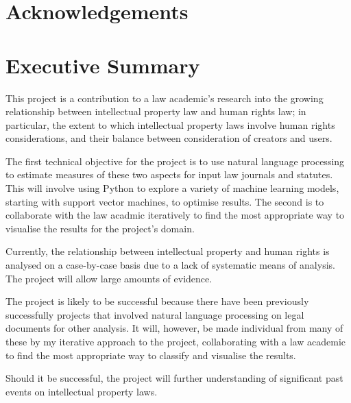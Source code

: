 \section*{Acknowledgements}
	\newpage
	
\section*{Executive Summary}	
	This project is a contribution to a law academic's research into the growing relationship between intellectual 	property law and human rights law; in particular, the extent to which intellectual property laws involve human rights considerations, and their balance between consideration of creators and users. 
	
	The first technical objective for the project is to use natural language processing to estimate measures of these two aspects for input law journals and statutes. This will involve using Python to explore a variety of machine learning models, starting with support vector machines, to optimise results. The second is to collaborate with the law acadmic iteratively to find the most appropriate way to visualise the results for the project's domain.

Currently, the relationship between intellectual property and human rights is analysed on a case-by-case basis due to a lack of systematic means of analysis. The project will allow large amounts of evidence.  

The project is likely to be successful because there have been previously successfully projects that involved natural language processing on legal documents for other analysis. It will, however, be made individual from many of these by my iterative approach to the project, collaborating with a law academic to find the most appropriate way to classify and visualise the results. 

Should it be successful, the project will further understanding of significant past events on intellectual property laws. 

\tableofcontents